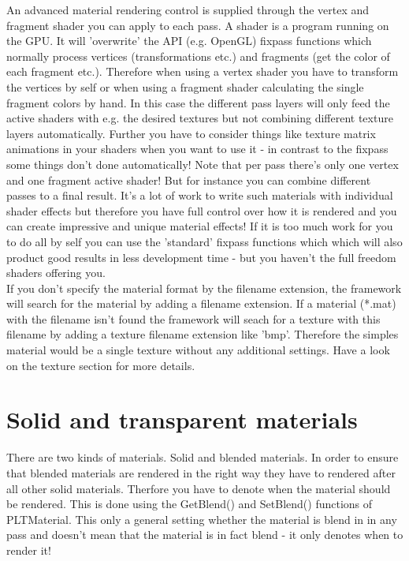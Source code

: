 An advanced material rendering control is supplied through the vertex and fragment shader you can apply
to each pass. A shader is a program running on the \ac{GPU}. It will 'overwrite' the \ac{API} (e.g. \ac{OpenGL})
fixpass functions which normally process vertices (transformations etc.) and fragments (get the color
of each fragment etc.). Therefore when using a vertex shader you have to transform the vertices by self
or when using a fragment shader calculating the single fragment colors by hand. In this case the
different pass layers will only feed the active shaders with e.g. the desired textures but not combining
different texture layers automatically. Further you have to consider things like texture matrix animations
in your shaders when you want to use it - in contrast to the fixpass some things don't done automatically!
Note that per pass there's only one vertex and one fragment active shader! But for instance you can
combine different passes to a final result. It's a lot of work to write such materials with individual
shader effects but therefore you have full control over how it is rendered and you can create impressive
and unique material effects! If it is too much work for you to do all by self you can use the 'standard'
fixpass functions which which will also product good results in less development time - but you haven't
the full freedom shaders offering you.\\

If you don't specify the material format by the filename extension, the framework will search for the material
by adding a filename extension. If a material (*.mat) with the filename isn't found the framework will seach for a 
texture with this filename by adding a texture filename extension like 'bmp'. Therefore the simples
material would be a single texture without any additional settings. Have a look on the texture section
for more details.



\section{Solid and transparent materials}
There are two kinds of materials. Solid and blended materials. In order to ensure that blended
materials are rendered in the right way they have to rendered after all other solid materials.
Therfore you have to denote when the material should be rendered. This is done using the GetBlend()
and SetBlend() functions of PLTMaterial. This only a general setting whether the material is blend
in in any pass and doesn't mean that the material is in fact blend - it only denotes when to
render it!




